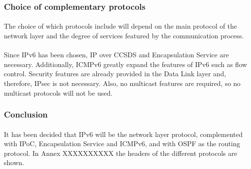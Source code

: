\subsubsection{Choice of complementary protocols}
\paragraph{}The choice of which protocols include will depend on the main protocol of the network layer and the degree of services featured by the communication process.
\paragraph{}Since IPv6 has been chosen, IP over CCSDS and Encapsulation Service are necessary. Additionally, ICMPv6 greatly expand the features of IPv6 such as flow control. Security features are already provided in the Data Link layer and, therefore, IPsec is not necessary. Also, no multicast features are required, so no multicast protocols will not be used.

\subsubsection{Conclusion}
\paragraph{}It has been decided that IPv6 will be the network layer protocol, complemented with IPoC, Encapsulation Service and ICMPv6, and with OSPF as the routing protocol. In Annex XXXXXXXXXX the headers of the different protocols are shown. 
